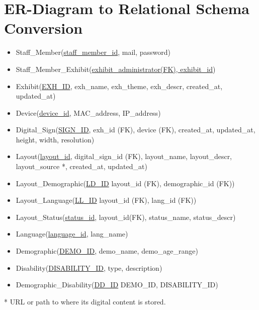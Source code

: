 \documentclass{exam}
\begin{document}
\pagebreak
\section*{ER-Diagram to Relational Schema Conversion}
\bigskip
\begin{itemize}
\item Staff\_Member(\underline{staff\_member\_id}, mail, password)

\item Staff\_Member\_Exhibit(\underline{exhibit\_administrator(FK), exhibit\_id})

\item Exhibit(\underline{EXH\_ID}, exh\_name, exh\_theme, exh\_descr, created\_at, updated\_at)

\item Device(\underline{device\_id}, MAC\_address, IP\_address)

\item Digital\_Sign(\underline{SIGN\_ID}, exh\_id (FK), device (FK), created\_at, updated\_at, height, width, resolution)

\item Layout(\underline{layout\_id}, digital\_sign\_id (FK), layout\_name, layout\_descr, layout\_source *, created\_at, updated\_at)

\item Layout\_Demographic(\underline{LD\_ID} layout\_id (FK), demographic\_id (FK))

\item Layout\_Language(\underline{LL\_ID} layout\_id (FK), lang\_id (FK))

\item Layout\_Status(\underline{status\_id}, layout\_id(FK), status\_name, status\_descr)

\item Language(\underline{language\_id}, lang\_name)

\item Demographic(\underline{DEMO\_ID}, demo\_name, demo\_age\_range)

\item Disability(\underline{DISABILITY\_ID}, type, description)

\item Demographic\_Disability(\underline{DD\_ID} DEMO\_ID, DISABILITY\_ID)
\end{itemize}
\bigskip
* URL or path to where its digital content is stored.
\end{document}
